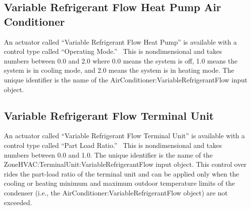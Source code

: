 \subsection{Variable Refrigerant Flow Heat Pump Air Conditioner}\label{variable-refrigerant-flow-heat-pump-air-conditioner}

An actuator called ``Variable Refrigerant Flow Heat Pump'' is available with a control type called ``Operating Mode.''~ This is nondimensional and takes numbers between 0.0 and 2.0 where 0.0 means the system is off, 1.0 means the system is in cooling mode, and 2.0 means the system is in heating mode. The unique identifier is the name of the AirConditioner:VariableRefrigerantFlow input object.

\subsection{Variable Refrigerant Flow Terminal Unit}\label{variable-refrigerant-flow-terminal-unit}

An actuator called ``Variable Refrigerant Flow Terminal Unit'' is available with a control type called ``Part Load Ratio.''~ This is nondimensional and takes numbers between 0.0 and 1.0. The unique identifier is the name of the ZoneHVAC:TerminalUnit:VariableRefrigerantFlow input object. This control over rides the part-load ratio of the terminal unit and can be applied only when the cooling or heating minimum and maximum outdoor temperature limits of the condenser (i.e., the AirConditioner:VariableRefrigerantFlow object) are not exceeded.
